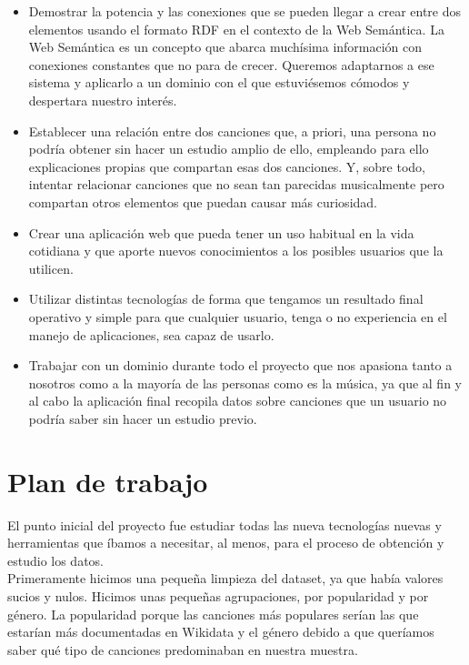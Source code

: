 \begin{itemize}
\item Demostrar la potencia y las conexiones que se pueden llegar a crear entre dos elementos usando el formato RDF en el contexto de la Web Semántica. La Web Semántica es un concepto que abarca muchísima información con conexiones constantes que no para de crecer. Queremos adaptarnos a ese sistema y aplicarlo a un dominio con el que estuviésemos cómodos y despertara nuestro interés.\\

\item Establecer una relación entre dos canciones que, a priori, una persona no podría obtener sin hacer un estudio amplio de ello, empleando para ello explicaciones propias que compartan esas dos canciones. Y, sobre todo, intentar relacionar canciones que no sean tan parecidas musicalmente pero compartan otros elementos que puedan causar más curiosidad.\\

\item Crear una aplicación web que pueda tener un uso habitual en la vida cotidiana y que aporte nuevos conocimientos a los posibles usuarios que la utilicen.\\

\item Utilizar distintas tecnologías de forma que tengamos un resultado final operativo y simple para que cualquier usuario, tenga o no experiencia en el manejo de aplicaciones, sea capaz de usarlo.\\

\item Trabajar con un dominio durante todo el proyecto que nos apasiona tanto a nosotros como a la mayoría de las personas como es la música, ya que al fin y al cabo la aplicación final recopila datos sobre canciones que un usuario no podría saber sin hacer un estudio previo.\\
\end{itemize}

\section{Plan de trabajo}

El punto inicial del proyecto fue estudiar todas las nueva tecnologías nuevas y herramientas que íbamos a necesitar, al menos, para el proceso de obtención y estudio los datos.\\

Primeramente hicimos una pequeña limpieza del dataset, ya que había valores sucios y nulos. Hicimos unas pequeñas agrupaciones, por popularidad y por género. La popularidad porque las canciones más populares serían las que estarían más documentadas en Wikidata y el género debido a que queríamos saber qué tipo de canciones predominaban en nuestra muestra.\\

